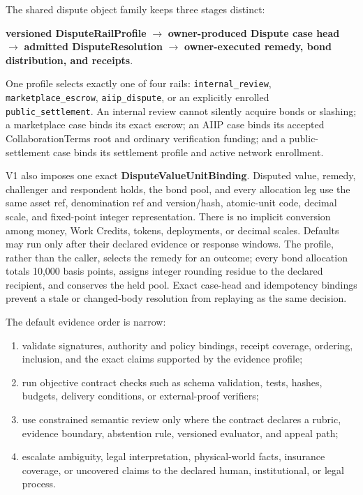 \documentclass[
  11pt,
]{article}
\providecommand{\tightlist}{%
  \setlength{\itemsep}{0pt}\setlength{\parskip}{0pt}}
\begin{document}
The shared dispute object family keeps three stages distinct:

\begin{center}
\textbf{versioned DisputeRailProfile} $\rightarrow$
\textbf{owner-produced Dispute case head} $\rightarrow$
\textbf{admitted DisputeResolution} $\rightarrow$
\textbf{owner-executed remedy, bond distribution, and receipts}.
\end{center}

One profile selects exactly one of four rails:
\texttt{internal\_review}, \texttt{marketplace\_escrow},
\texttt{aiip\_dispute}, or an explicitly enrolled
\texttt{public\_settlement}. An internal review cannot silently acquire bonds
or slashing; a marketplace case binds its exact escrow; an AIIP case binds its
accepted CollaborationTerms root and ordinary verification funding; and a
public-settlement case binds its settlement profile and active network
enrollment.

V1 also imposes one exact \textbf{DisputeValueUnitBinding}. Disputed value,
remedy, challenger and respondent holds, the bond pool, and every allocation
leg use the same asset ref, denomination ref and version/hash, atomic-unit code,
decimal scale, and fixed-point integer representation. There is no implicit
conversion among money, Work Credits, tokens, deployments, or decimal scales.
Defaults may run only after their declared evidence or response windows. The
profile, rather than the caller, selects the remedy for an outcome; every bond
allocation totals 10,000 basis points, assigns integer rounding residue to the
declared recipient, and conserves the held pool. Exact case-head and
idempotency bindings prevent a stale or changed-body resolution from replaying
as the same decision.

The default evidence order is narrow:

\begin{enumerate}
\def\labelenumi{\arabic{enumi}.}
\tightlist
\item
  validate signatures, authority and policy bindings, receipt coverage,
  ordering, inclusion, and the exact claims supported by the evidence profile;
\item
  run objective contract checks such as schema validation, tests, hashes,
  budgets, delivery conditions, or external-proof verifiers;
\item
  use constrained semantic review only where the contract declares a rubric,
  evidence boundary, abstention rule, versioned evaluator, and appeal path;
\item
  escalate ambiguity, legal interpretation, physical-world facts, insurance
  coverage, or uncovered claims to the declared human, institutional, or legal
  process.
\end{enumerate}
\end{document}
